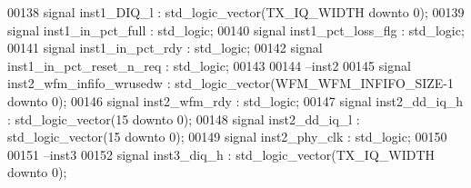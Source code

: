 \begin{DoxyCode}
00138 \textcolor{keywordflow}{signal} \textcolor{vhdlchar}{inst1_DIQ_l}               \textcolor{vhdlchar}{:} \textcolor{comment}{std\_logic\_vector}\textcolor{vhdlchar}{(}\textcolor{vhdlchar}{TX_IQ_WIDTH} \textcolor{keywordflow}{downto} \textcolor{vhdllogic}{}\textcolor{vhdllogic}{0}\textcolor{vhdlchar}{)};
00139 \textcolor{keywordflow}{signal} \textcolor{vhdlchar}{inst1_in_pct_full}         \textcolor{vhdlchar}{:} \textcolor{comment}{std\_logic};
00140 \textcolor{keywordflow}{signal} \textcolor{vhdlchar}{inst1_pct_loss_flg}        \textcolor{vhdlchar}{:} \textcolor{comment}{std\_logic};
00141 \textcolor{keywordflow}{signal} \textcolor{vhdlchar}{inst1_in_pct_rdy}          \textcolor{vhdlchar}{:} \textcolor{comment}{std\_logic};
00142 \textcolor{keywordflow}{signal} \textcolor{vhdlchar}{inst1_in_pct_reset_n_req}  \textcolor{vhdlchar}{:} \textcolor{comment}{std\_logic};
00143 
00144 \textcolor{keyword}{--inst2}
00145 \textcolor{keywordflow}{signal} \textcolor{vhdlchar}{inst2_wfm_infifo_wrusedw}  \textcolor{vhdlchar}{:} \textcolor{comment}{std\_logic\_vector}\textcolor{vhdlchar}{(}\textcolor{vhdlchar}{WFM_WFM_INFIFO_SIZE}\textcolor{vhdlchar}{-}\textcolor{vhdllogic}{}\textcolor{vhdllogic}{1} \textcolor{keywordflow}{downto} \textcolor{vhdllogic}{}\textcolor{vhdllogic}{0}\textcolor{vhdlchar}{)};
00146 \textcolor{keywordflow}{signal} \textcolor{vhdlchar}{inst2_wfm_rdy}             \textcolor{vhdlchar}{:} \textcolor{comment}{std\_logic};
00147 \textcolor{keywordflow}{signal} \textcolor{vhdlchar}{inst2_dd_iq_h}             \textcolor{vhdlchar}{:} \textcolor{comment}{std\_logic\_vector}\textcolor{vhdlchar}{(}\textcolor{vhdllogic}{}\textcolor{vhdllogic}{15} \textcolor{keywordflow}{downto} \textcolor{vhdllogic}{}\textcolor{vhdllogic}{0}\textcolor{vhdlchar}{)};
00148 \textcolor{keywordflow}{signal} \textcolor{vhdlchar}{inst2_dd_iq_l}             \textcolor{vhdlchar}{:} \textcolor{comment}{std\_logic\_vector}\textcolor{vhdlchar}{(}\textcolor{vhdllogic}{}\textcolor{vhdllogic}{15} \textcolor{keywordflow}{downto} \textcolor{vhdllogic}{}\textcolor{vhdllogic}{0}\textcolor{vhdlchar}{)};
00149 \textcolor{keywordflow}{signal} \textcolor{vhdlchar}{inst2_phy_clk}             \textcolor{vhdlchar}{:} \textcolor{comment}{std\_logic};
00150 
00151 \textcolor{keyword}{--inst3}
00152 \textcolor{keywordflow}{signal} \textcolor{vhdlchar}{inst3_diq_h}               \textcolor{vhdlchar}{:} \textcolor{comment}{std\_logic\_vector}\textcolor{vhdlchar}{(}\textcolor{vhdlchar}{TX_IQ_WIDTH} \textcolor{keywordflow}{downto} \textcolor{vhdllogic}{}\textcolor{vhdllogic}{0}\textcolor{vhdlchar}{)};

\end{DoxyCode}
